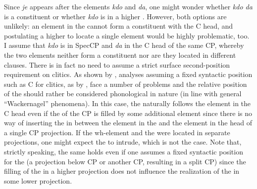 \documentclass[output=paper,modfonts, hidelinks, newtxmath]{langscibook}
\begin{document}
{\noindent Since \textit{je} appears after the elements \textit{kdo} and \textit{da}, one might wonder whether \textit{kdo da} is a constituent or whether \textit{kdo} is in a higher . However, both options are unlikely: an element in the  cannot form a constituent with the C head, and postulating a higher  to locate a single element would be highly problematic, too. I assume that \textit{kdo} is in SpecCP and \textit{da} in the C head of the same CP, whereby the two elements neither form a constituent nor are they located in different clauses. There is in fact no need to assume a strict surface second-position requirement on  clitics. As shown by \citet{marusic2008}, analyses assuming a fixed syntactic position such as C for clitics, as by \citet{goldenmilojevicsheppard2000}, face a number of problems and the relative position of the  should rather be considered phonological in nature (in line with general ``Wackernagel'' phenomena). In this case, the  naturally follows the element in the C head even if the  of the CP is filled by some additional element since there is no way of inserting the  in between the element in the  and the element in the head of a single CP projection. If the wh-element and the   were located in separate projections, one might expect the  to intrude, which is not the case. Note that, strictly speaking, the same holds even if one assumes a fixed syntactic position for the  (a projection below CP or another CP, resulting in a split CP) since the filling of the  in a higher projection does not influence the realization of the  in some lower projection.}

\ea
	\z
\z
\end{document}
